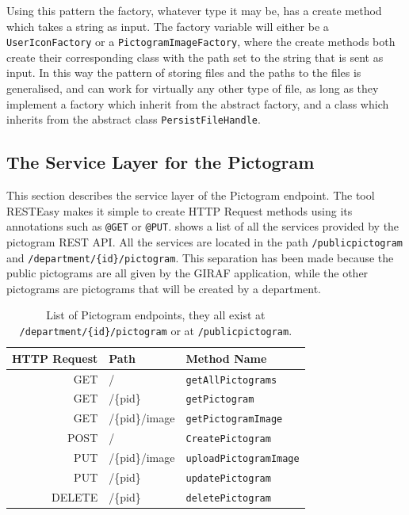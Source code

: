 Using this pattern the factory, whatever type it may be, has a create method which takes a string as input.
The factory variable will either be a \texttt{UserIconFactory} or a \texttt{PictogramImageFactory}, where the create methods both create their corresponding class with the path set to the string that is sent as input.
In this way the pattern of storing files and the paths to the files is generalised, and can work for virtually any other type of file, as long as they implement a factory which inherit from the abstract factory, and a class which inherits from the abstract class \texttt{PersistFileHandle}.

\subsection{The Service Layer for the Pictogram}\label{ssec:pictogram_service}
This section describes the service layer of the Pictogram endpoint.
The tool RESTEasy makes it simple to create HTTP Request methods using its annotations such as \texttt{@GET} or \texttt{@PUT}.
 shows a list of all the services provided by the pictogram REST API.
All the services are located in the path \texttt{/publicpictogram} and \texttt{/department/\{id\}/pictogram}.
This separation has been made because the public pictograms are all given by the GIRAF application, while the other pictograms are pictograms that will be created by a department.

\begin{table}[]
\footnotesize
\centering
\begin{tabular}{rll}
HTTP Request    & Path          & Method Name                   \\
\midrule
GET             &/              & \texttt{getAllPictograms}     \\
GET             &/\{pid\}       & \texttt{getPictogram}         \\
GET             &/\{pid\}/image & \texttt{getPictogramImage}    \\
\tblgrpsep
POST            &/              & \texttt{CreatePictogram}      \\
\tblgrpsep
PUT             &/\{pid\}/image & \texttt{uploadPictogramImage} \\
PUT             &/\{pid\}       & \texttt{updatePictogram}      \\
\tblgrpsep
DELETE          &/\{pid\}	    & \texttt{deletePictogram}	    \\
\end{tabular}
\caption{List of Pictogram endpoints, they all exist at \texttt{/department/\{id\}/pictogram} or at \texttt{/publicpictogram}.}\label{tbl:pictogramservice}
\end{table}

